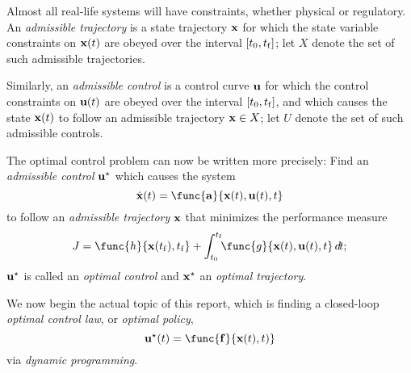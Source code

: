 \documentclass{article}
\begin{document}
\begin{defn}
	Almost all real-life systems will have constraints,
	whether physical or regulatory.
	An \emph{admissible trajectory}
	is a state trajectory \( {\mathbf{x}} \) for which
	the state variable constraints on \( {\mathbf{x}}(t) \) are obeyed
	over the interval \( [t_0, t_{\mathrm{f}}] \);
	let \( X \) denote the set of such admissible trajectories.
	\par
	Similarly, an \emph{admissible control}
	is a control curve \( {\mathbf{u}} \) for which
	the control constraints on \( {\mathbf{u}}(t) \) are obeyed
	over the interval \( [t_0, t_{\mathrm{f}}] \),
	and which causes the state \( {\mathbf{x}}(t) \) to follow
	an admissible trajectory \( {\mathbf{x}} \in X \);
	let \( U \) denote the set of such admissible controls.
\end{defn}

The optimal control problem can now be written more precisely:
Find an \emph{admissible control} \( {\mathbf{u}}^\star \)
which causes the system
\[
	\dot{\vecx}(t) =
		\func{\veca}{\vecx(t), \vecu(t), t}
\]
to follow an \emph{admissible trajectory} \( {\mathbf{x}} \)
that minimizes the performance measure
\[
	J = \func{h}{\vecx(t_\fl),t_\fl} +
		\intt{\func{g}{\vecx(t), \vecu(t), t} \dd t};
\]
\( {\mathbf{u}}^\star \) is called an \emph{optimal control} and
\( {\mathbf{x}}^\star \) an \emph{optimal trajectory}.

\bigskip\noindent
We now begin the actual topic of this report,
which is finding a closed-loop
\emph{optimal control law}, or \emph{optimal policy},
\[
	\vecu\opt(t) = \func{\mathbf{f}}{\vecx(t), t)}
\]
via \emph{dynamic programming}.
\end{document}
